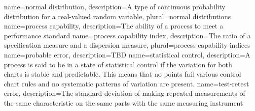 {
    name={normal distribution},
    description={A type of continuous probability distribution for a real-valued random variable},
    plural={normal distributions}
}
{
    name={process capability},
    description={The ability of a process to meet a performance standard}
}
{
    name={process capability index},
    description={The ratio of a specification measure and a dispersion measure},
    plural={process capability indices}
}
{
    name={probable error},
    description={TBD}
}
{
    name={statistical control},
    description={A process is said to be in a state of statistical control if the variation for both charts is stable and predictable. This means that no points fail various control chart rules and no systematic patterns of variation are present.}
}
{
    name={test-retest error},
    description={The standard deviation of making repeated measurements of the same characteristic on the same parts with the same measuring instrument}
}
